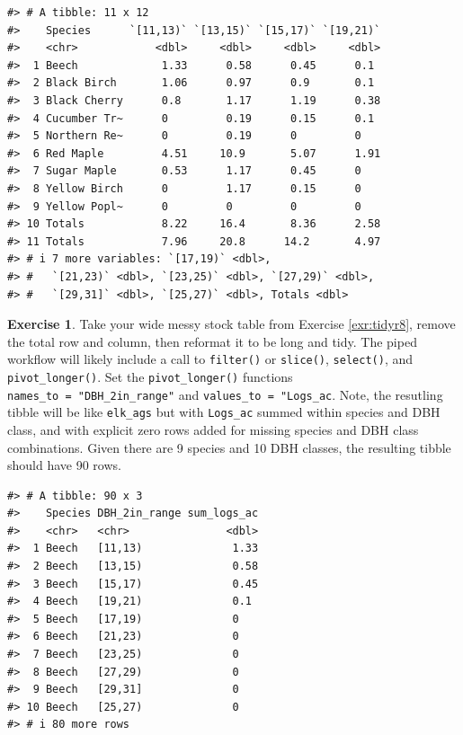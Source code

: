 \documentclass[
  11pt,
]{krantz}
\theoremstyle{definition}
\theoremstyle{definition}
\theoremstyle{definition}
\newtheorem{exercise}{Exercise}[chapter]
\theoremstyle{definition}
\theoremstyle{remark}
\begin{document}
\begin{verbatim}
#> # A tibble: 11 x 12
#>    Species      `[11,13)` `[13,15)` `[15,17)` `[19,21)`
#>    <chr>            <dbl>     <dbl>     <dbl>     <dbl>
#>  1 Beech             1.33      0.58      0.45      0.1 
#>  2 Black Birch       1.06      0.97      0.9       0.1 
#>  3 Black Cherry      0.8       1.17      1.19      0.38
#>  4 Cucumber Tr~      0         0.19      0.15      0.1 
#>  5 Northern Re~      0         0.19      0         0   
#>  6 Red Maple         4.51     10.9       5.07      1.91
#>  7 Sugar Maple       0.53      1.17      0.45      0   
#>  8 Yellow Birch      0         1.17      0.15      0   
#>  9 Yellow Popl~      0         0         0         0   
#> 10 Totals            8.22     16.4       8.36      2.58
#> 11 Totals            7.96     20.8      14.2       4.97
#> # i 7 more variables: `[17,19)` <dbl>,
#> #   `[21,23)` <dbl>, `[23,25)` <dbl>, `[27,29)` <dbl>,
#> #   `[29,31]` <dbl>, `[25,27)` <dbl>, Totals <dbl>
\end{verbatim}

\begin{exercise}
\protect\hypertarget{exr:tidyr9}{}\label{exr:tidyr9}Take your wide messy stock table from Exercise \ref{exr:tidyr8}, remove the total row and column, then reformat it to be long and tidy. The piped workflow will likely include a call to \texttt{filter()} or \texttt{slice()}, \texttt{select()}, and \texttt{pivot\_longer()}. Set the \texttt{pivot\_longer()} functions \texttt{names\_to\ =\ "DBH\_2in\_range"} and \texttt{values\_to\ =\ "Logs\_ac}. Note, the resutling tibble will be like \texttt{elk\_ags} but with \texttt{Logs\_ac} summed within species and DBH class, and with explicit zero rows added for missing species and DBH class combinations. Given there are 9 species and 10 DBH classes, the resulting tibble should have 90 rows.
\end{exercise}

\begin{verbatim}
#> # A tibble: 90 x 3
#>    Species DBH_2in_range sum_logs_ac
#>    <chr>   <chr>               <dbl>
#>  1 Beech   [11,13)              1.33
#>  2 Beech   [13,15)              0.58
#>  3 Beech   [15,17)              0.45
#>  4 Beech   [19,21)              0.1 
#>  5 Beech   [17,19)              0   
#>  6 Beech   [21,23)              0   
#>  7 Beech   [23,25)              0   
#>  8 Beech   [27,29)              0   
#>  9 Beech   [29,31]              0   
#> 10 Beech   [25,27)              0   
#> # i 80 more rows
\end{verbatim}
\end{document}
